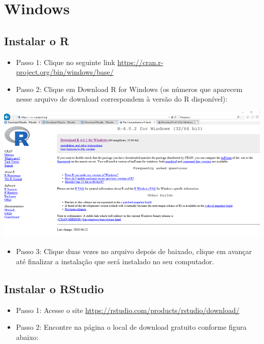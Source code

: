 \documentclass[
  brazil,
]{book}
\providecommand{\tightlist}{%
  \setlength{\itemsep}{0pt}\setlength{\parskip}{0pt}}
\begin{document}
\hypertarget{windows}{%
\section{Windows}\label{windows}}

\hypertarget{instalar-o-r-2}{%
\subsection{Instalar o R}\label{instalar-o-r-2}}

\begin{itemize}
\tightlist
\item
  Passo 1: Clique no seguinte link \url{https://cran.r-project.org/bin/windows/base/}\\
\item
  Passo 2: Clique em Download R for Windows (os números que aparecem nesse arquivo de download correspondem à versão do R disponível):
\end{itemize}

\includegraphics[width=13.54in]{img/inst_1_rwindows}

\begin{itemize}
\tightlist
\item
  Passo 3: Clique duas vezes no arquivo depois de baixado, clique em avançar até finalizar a instalação que será instalado no seu computador.
\end{itemize}

\hypertarget{instalar-o-rstudio-2}{%
\subsection{Instalar o RStudio}\label{instalar-o-rstudio-2}}

\begin{itemize}
\tightlist
\item
  Passo 1: Acesse o site \url{https://rstudio.com/products/rstudio/download/}\\
\item
  Passo 2: Encontre na página o local de download gratuito conforme figura abaixo:
\end{itemize}
\end{document}
